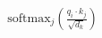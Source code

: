 \documentclass[preview]{standalone}
\begin{document}
\begin{align*}
\mathrm{softmax}_j\!\left(\frac{q_i \cdot k_j}{\sqrt{d_k}}\right)
\end{align*}
\end{document}

